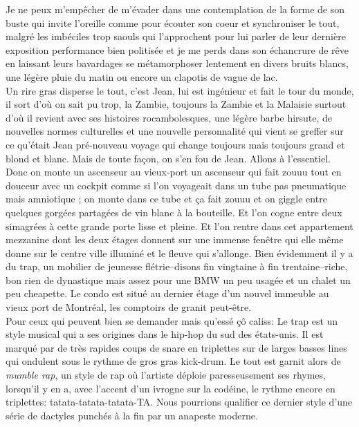 Je ne peux m'empêcher de m'évader dans une contemplation de la forme 
de son buste qui invite l'oreille comme pour écouter son coeur et synchroniser
le tout, malgré les imbéciles trop saouls qui l'approchent pour lui parler
de leur dernière exposition performance bien politisée et je me perds dans
son échancrure de rêve en laissant leurs bavardages se métamorphoser 
lentement en divers bruits blancs, une légère pluie du matin ou encore
un clapotis de vague de lac.\\

Un rire gras disperse le tout, c'est Jean, lui est ingénieur et
fait le tour du monde, il sort d'où on sait pu trop, la Zambie, toujours la
Zambie et la Malaisie surtout d'où il revient avec ses histoires rocambolesques,
une légère barbe hirsute, de nouvelles normes culturelles et une nouvelle
personnalité qui vient se greffer sur ce qu'était Jean pré-nouveau voyage qui
change toujours mais toujours grand et blond et blanc. Mais de toute façon,
on s'en fou de Jean. Allons à l'essentiel.\\

Donc on monte un ascenseur au vieux-port un ascenseur qui fait zouuu tout en
douceur avec un cockpit comme si l'on voyageait dans un tube pas pneumatique
mais amniotique ; on monte dans ce tube et ça fait zouuu et on giggle
entre quelques gorgées partagées de vin blanc à la bouteille. Et l'on cogne
entre deux simagrées à cette grande porte lisse et pleine. Et l'on rentre dans
cet appartement mezzanine dont les deux étages donnent sur une immense fenêtre
qui elle même donne sur le centre ville illuminé et le fleuve qui s'allonge.
Bien évidemment il y a du trap, un mobilier de jeunesse flétrie--disons fin
vingtaine à fin trentaine--riche, bon rien de dynastique mais assez pour
une BMW un peu usagée et un chalet un peu cheapette.
Le condo est situé au dernier étage d'un nouvel immeuble au vieux port de
Montréal, les comptoirs de granit peut-être.\\

Pour ceux qui peuvent bien se demander mais qu'essé çô caliss: 
Le trap est un style musical qui a ses origines dans le hip-hop du sud des
états-unis. Il est marqué par de très rapides coups de snare en triplettes sur
de larges basses lines qui ondulent sous le rythme de gros gras kick-drum. Le
tout est garnit alors de \textit{mumble rap}, un style de rap où l'artiste
déploie paresseusement ses rhymes, lorsqu'il y en a, avec l'accent d'un ivrogne
sur la codéine, le rythme encore en triplettes: tatata-tatata-tatata-TA. Nous
pourrions qualifier ce dernier style d'une série de dactyles punchés à la fin
par un anapeste moderne.\\

